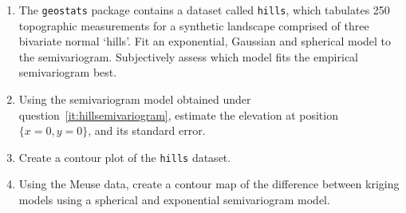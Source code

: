 \begin{enumerate}

\item\label{it:hillsemivariogram} The \texttt{geostats} package
  contains a dataset called \texttt{hills}, which tabulates 250
  topographic measurements for a synthetic landscape comprised of
  three bivariate normal `hills'. Fit an exponential, Gaussian and
  spherical model to the semivariogram. Subjectively assess which
  model fits the empirical semivariogram best.

\item Using the semivariogram model obtained under
  question~\ref{it:hillsemivariogram}, estimate the elevation at
  position $\{x=0,y=0\}$, and its standard error.

\item Create a contour plot of the \texttt{hills} dataset.
  
\item Using the Meuse data, create a contour map of the difference
  between kriging models using a spherical and exponential
  semivariogram model.

\end{enumerate}
